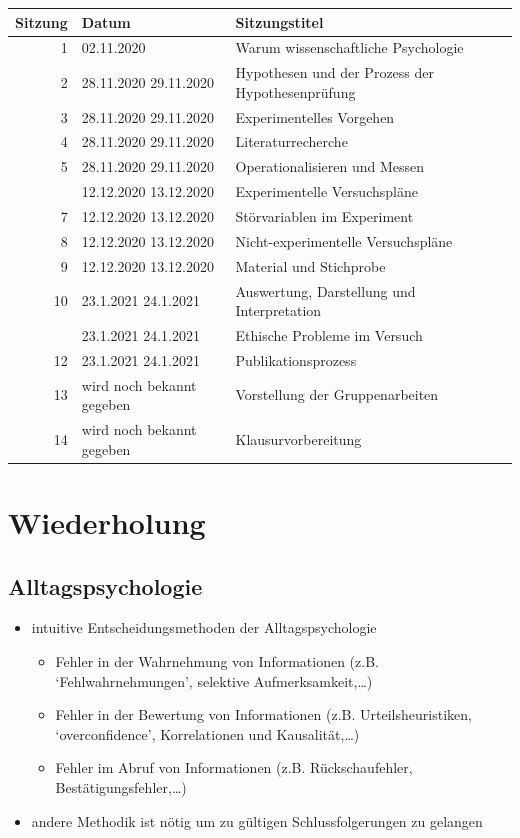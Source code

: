 \documentclass[
]{book}
\begin{document}
\begin{tabular}[t]{rll}
\toprule
Sitzung & Datum & Sitzungstitel\\
\midrule
1 & 02.11.2020 & Warum wissenschaftliche Psychologie\\
2 & 28.11.2020
29.11.2020 & Hypothesen und der Prozess der Hypothesenprüfung\\
3 & 28.11.2020
29.11.2020 & Experimentelles Vorgehen\\
4 & 28.11.2020
29.11.2020 & Literaturrecherche\\
5 & 28.11.2020
29.11.2020 & Operationalisieren und Messen\\
\addlinespace
6 & 12.12.2020
13.12.2020 & Experimentelle Versuchspläne\\
7 & 12.12.2020
13.12.2020 & Störvariablen im Experiment\\
8 & 12.12.2020
13.12.2020 & Nicht-experimentelle Versuchspläne\\
9 & 12.12.2020
13.12.2020 & Material und Stichprobe\\
10 & 23.1.2021
24.1.2021 & Auswertung, Darstellung und Interpretation\\
\addlinespace
11 & 23.1.2021
24.1.2021 & Ethische Probleme im Versuch\\
12 & 23.1.2021
24.1.2021 & Publikationsprozess\\
13 & wird noch bekannt gegeben & Vorstellung der Gruppenarbeiten\\
14 & wird noch bekannt gegeben & Klausurvorbereitung\\
\bottomrule
\end{tabular}

\hypertarget{wiederholung}{%
\section{Wiederholung}\label{wiederholung}}

\hypertarget{alltagspsychologie}{%
\subsection{Alltagspsychologie}\label{alltagspsychologie}}

\begin{itemize}
\item
  intuitive Entscheidungsmethoden der Alltagspsychologie

  \begin{itemize}
  \item
    Fehler in der Wahrnehmung von Informationen (z.B. `Fehlwahrnehmungen', selektive Aufmerksamkeit,\ldots)
  \item
    Fehler in der Bewertung von Informationen (z.B. Urteilsheuristiken, `overconfidence', Korrelationen und Kausalität,\ldots)
  \item
    Fehler im Abruf von Informationen (z.B. Rückschaufehler, Bestätigungsfehler,\ldots)
  \end{itemize}
\item
  andere Methodik ist nötig um zu gültigen Schlussfolgerungen zu gelangen
\end{itemize}
\end{document}
